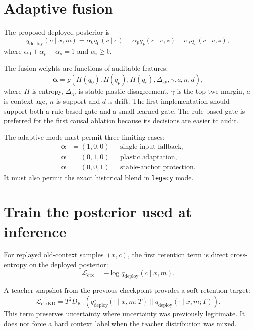 \documentclass[10pt]{article}
\begin{document}
\section{Adaptive fusion}
The proposed deployed posterior is
\begin{equation}
q_{\mathrm{deploy}}(c\mid x,m)
=
\alpha_0 q_0(c\mid e)
+
\alpha_p q_p(c\mid e,z)
+
\alpha_s q_s(c\mid e,z),
\end{equation}
where $\alpha_0+\alpha_p+\alpha_s=1$ and $\alpha_i\geq0$.

The fusion weights are functions of auditable features:
\begin{equation}
\boldsymbol{\alpha}=g( H(q_0),H(q_p),H(q_s),\Delta_{sp},\gamma, a, n, d),
\end{equation}
where $H$ is entropy, $\Delta_{sp}$ is stable-plastic disagreement, $\gamma$ is the top-two margin, $a$ is context age, $n$ is support and $d$ is drift. The first implementation should support both a rule-based gate and a small learned gate. The rule-based gate is preferred for the first causal ablation because its decisions are easier to audit.

The adaptive mode must permit three limiting cases:
\begin{align}
\boldsymbol{\alpha}&=(1,0,0) && \text{single-input fallback},\\
\boldsymbol{\alpha}&=(0,1,0) && \text{plastic adaptation},\\
\boldsymbol{\alpha}&=(0,0,1) && \text{stable-anchor protection}.
\end{align}
It must also permit the exact historical blend in \texttt{legacy} mode.

\section{Train the posterior used at inference}
For replayed old-context samples $(x,c)$, the first retention term is direct cross-entropy on the deployed posterior:
\begin{equation}
\mathcal{L}_{\mathrm{ctx}}=
-\log q_{\mathrm{deploy}}(c\mid x,m).
\end{equation}

A teacher snapshot from the previous checkpoint provides a soft retention target:
\begin{equation}
\mathcal{L}_{\mathrm{ctxKD}}
=
T^2 D_{\mathrm{KL}}\left(
q^{\star}_{\mathrm{deploy}}(\cdot\mid x,m;T)
\parallel
q_{\mathrm{deploy}}(\cdot\mid x,m;T)
\right).
\end{equation}
This term preserves uncertainty where uncertainty was previously legitimate. It does not force a hard context label when the teacher distribution was mixed.
\end{document}
